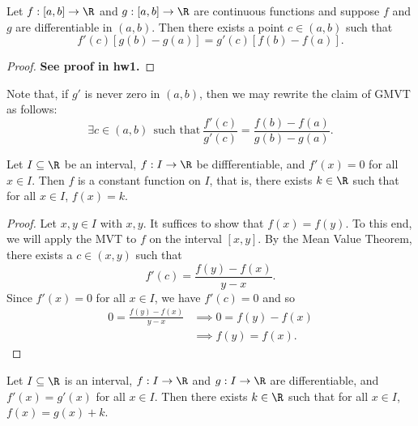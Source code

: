 \begin{theorem}
    Let \( f: [a,b] \to \R  \) and \( g : [a,b] \to \R  \) are continuous functions and suppose \( f  \) and \( g  \) are differentiable in \( (a,b) \). Then there exists a point \( c \in (a,b) \) such that 
    \[  f'(c) [g(b) - g(a)] = g'(c) [f(b) - f(a)]. \]
\end{theorem}
\begin{proof}
    \textbf{See proof in hw1.}
\end{proof}

\begin{remark}
    Note that, if \( g'  \) is never zero in \( (a,b) \), then we may rewrite the claim of GMVT as follows:
    \[  \exists c \in (a,b) \ \ \text{such that} \ \frac{ f'(c) }{  g'(c) } =  \frac{ f(b) - f(a) }{  g(b) - g(a) }. \]
\end{remark}

\begin{corollary}[Corollary 1]
    Let \( I \subseteq  \R   \) be an interval, \( f : I \to \R  \) be diffferentiable, and \( f'(x) = 0  \) for all \( x \in I  \). Then \( f  \) is a constant function on \( I  \), that is, there exists \( k \in \R  \) such that for all \( x \in I  \), \( f(x) = k  \). 
\end{corollary}

\begin{proof}
    Let \( x,y \in I  \) with \( x , y  \). It suffices to show that \( f(x) = f(y) \). To this end, we will apply the MVT to \( f  \) on the interval \( [x,y] \). By the Mean Value Theorem, there exists a \( c \in (x,y) \) such that 
    \[  f'(c) = \frac{ f(y) - f(x)  }{  y - x  }. \]
    Since \( f'(x) = 0  \) for all \( x \in I  \), we have \( f'(c) = 0  \) and so
    \begin{align*}
        0 = \frac{ f(y) - f(x) }{  y - x  }  &\implies 0 = f(y) - f(x)   \\
                                             &\implies f(y) = f(x).
    \end{align*}
\end{proof}

\begin{corollary}
    Let \( I \subseteq  \R   \) is an interval, \( f: I \to \R  \) and \( g: I \to \R  \) are differentiable, and \( f'(x) = g'(x) \) for all \( x \in I  \). Then there exists \( k \in \R  \) such that for all \( x \in I  \), \( f(x) = g(x) + k  \).
\end{corollary}

